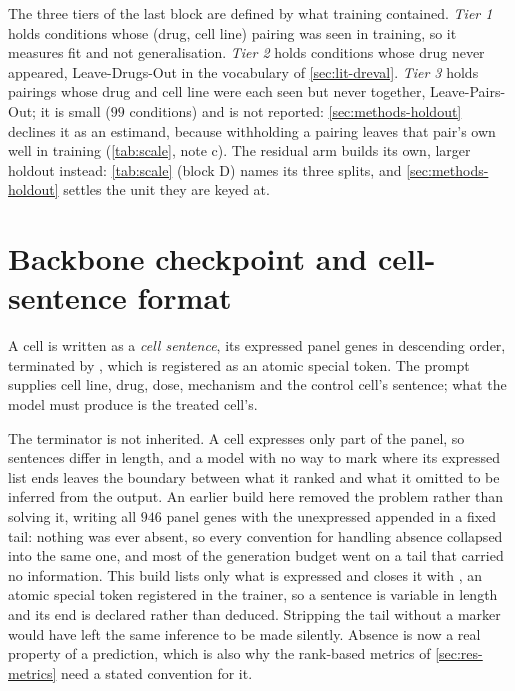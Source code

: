 
The three tiers of the last block are defined by what training contained.
\emph{Tier 1} holds conditions whose (drug, cell line) pairing was
seen in training, so it measures fit and not generalisation. \emph{Tier 2} holds
conditions whose drug never appeared, Leave-Drugs-Out in the vocabulary of
\cref{sec:lit-dreval}. \emph{Tier 3} holds pairings whose drug and cell line
were each seen but never together, Leave-Pairs-Out; it is small ($99$ conditions) and is not reported: \cref{sec:methods-holdout} declines it as an estimand, because withholding a pairing leaves that pair's own well in training (\cref{tab:scale}, note c). The residual arm
builds its own, larger holdout instead: \cref{tab:scale} (block D) names its three splits, and \cref{sec:methods-holdout} settles the unit they are keyed
at.

\section{Backbone checkpoint and cell-sentence format}

A cell is written as a \emph{cell sentence}, its expressed panel genes in
descending order, terminated by \ENDCELL{}, which is registered as an atomic
special token. The prompt supplies cell line, drug, dose, mechanism and the
control cell's sentence; what the model must produce is the treated cell's. 

The terminator is not inherited. A cell expresses only part of the panel, so
sentences differ in length, and a model with no way to mark where its expressed
list ends leaves the boundary between what it ranked and what it omitted to be
inferred from the output. An earlier build here removed the problem rather than
solving it, writing all $946$ panel genes with the unexpressed appended in a
fixed tail: nothing was ever absent, so every convention for handling absence
collapsed into the same one, and most of the generation budget went on a tail
that carried no information. This build lists only what is expressed and closes
it with \ENDCELL{}, an atomic special token registered in the trainer, so a
sentence is variable in length and its end is declared rather than deduced.
Stripping the tail without a marker would have left the same inference to be made
silently. Absence is now a real property of a prediction, which is also why the
rank-based metrics of \cref{sec:res-metrics} need a stated convention for it.

